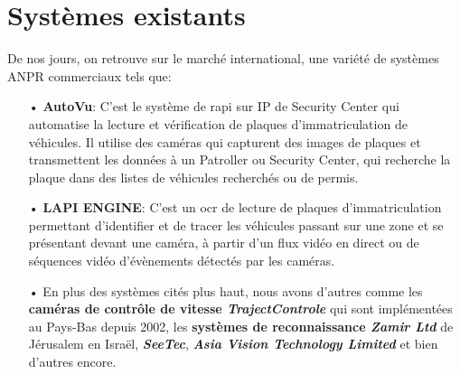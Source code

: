 \section{Systèmes existants}
De nos jours, on retrouve sur le marché international, une variété de systèmes ANPR commerciaux tels que:
    \begin{itemize}
        \item[•]\textbf{AutoVu}: C’est le système de \acrfull{rapi} sur IP de Security Center qui automatise la lecture et vérification de plaques d'immatriculation de véhicules. Il utilise des caméras qui capturent des images de plaques et transmettent les données à un Patroller ou Security Center, qui recherche la plaque dans des listes de véhicules recherchés ou de permis. \cite{autoVu}
        \item[•]\textbf{LAPI ENGINE}: C’est un \acrshort{ocr} de lecture de plaques d'immatriculation permettant d'identifier et de tracer les véhicules passant sur une zone et se présentant devant une caméra, à partir d'un flux vidéo en direct ou de séquences vidéo d'évènements détectés par les caméras. \cite{lapiWeb}
        \item[•] En plus des systèmes cités plus haut, nous avons d'autres comme les \textbf{caméras de contrôle de vitesse \textit{TrajectControle}} qui sont implémentées au Pays-Bas depuis 2002, les \textbf{systèmes de reconnaissance \textit{Zamir Ltd}} de Jérusalem en Israël, \textbf{\textit{SeeTec}}, \textbf{\textit{Asia Vision Technology Limited}} et bien d'autres encore. \cite{HindeThesis, NorMaster}
    \end{itemize} 
    